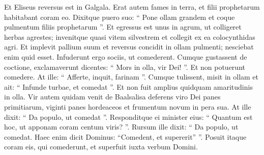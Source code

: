 \begin{biblechapter}
\begin{biblechapter}
\begin{biblechapter}
\begin{biblechapter}
 \verse Et Eliseus reversus est in Galgala. Erat autem fames in terra, et filii prophetarum habitabant coram eo. Dixitque puero suo: “ Pone ollam grandem et coque pulmentum filiis prophetarum ”. 
\verse Et egressus est unus in agrum, ut colligeret herbas agrestes; invenitque quasi vitem silvestrem et collegit ex ea colocynthidas agri. Et implevit pallium suum et reversus concidit in ollam pulmenti; nesciebat enim quid esset. 
\verse Infuderunt ergo sociis, ut comederent. Cumque gustassent de coctione, exclamaverunt dicentes: “ Mors in olla, vir Dei! ”. Et non potuerunt comedere. 
\verse At ille: “ Afferte, inquit, farinam ”. Cumque tulissent, misit in ollam et ait: “ Infunde turbae, et comedat ”. Et non fuit amplius quidquam amaritudinis in olla.
 \verse Vir autem quidam venit de Baalsalisa deferens viro Dei panes primitiarum, viginti panes hordeaceos et frumentum novum in pera sua. At ille dixit: “ Da populo, ut comedat ”. 
\verse Responditque ei minister eius: “ Quantum est hoc, ut apponam coram centum viris? ”. Rursum ille dixit: “ Da populo, ut comedat. Haec enim dicit Dominus: “Comedent, et supererit” ”. 
\verse Posuit itaque coram eis, qui comederunt, et superfuit iuxta verbum Domini.
 

\end{biblechapter}
\end{biblechapter}
\end{biblechapter}
\end{biblechapter}

